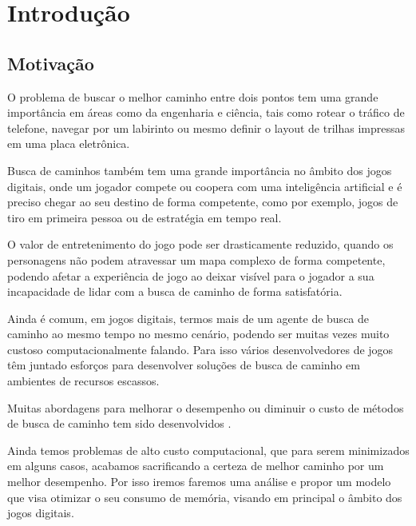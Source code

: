 
\chapter[Introdução]{Introdução}

\section{Motivação}

O problema de buscar o melhor caminho entre dois pontos tem uma grande importância em áreas como da engenharia e ciência, tais como rotear o tráfico de telefone, navegar por um labirinto ou mesmo definir o layout de trilhas impressas em uma placa eletrônica.

Busca de caminhos também tem uma grande importância no âmbito dos jogos digitais, onde um jogador compete ou coopera com uma inteligência artificial e é preciso chegar ao seu destino de forma competente, como por exemplo, jogos de tiro em primeira pessoa ou de estratégia em tempo real.

O valor de entretenimento do jogo pode ser drasticamente reduzido, quando os personagens não podem atravessar um mapa complexo de forma competente, podendo afetar a experiência de jogo ao deixar visível para o jogador a sua incapacidade de lidar com a busca de caminho de forma satisfatória.

Ainda é comum, em jogos digitais, termos mais de um agente de busca de caminho ao mesmo tempo no mesmo cenário, podendo ser muitas vezes muito custoso computacionalmente falando. Para isso vários desenvolvedores de jogos têm juntado esforços para desenvolver soluções de busca de caminho em ambientes de recursos escassos.\cite{Pontevia}


Muitas abordagens para melhorar o desempenho ou diminuir o custo de métodos de busca de caminho tem sido desenvolvidos \cite{Ulysses}  \cite{Pollack} \cite{Timothy} \cite{WilliamMiller}. 

Ainda temos problemas de alto custo computacional, que para serem minimizados em alguns casos, acabamos sacrificando a certeza de melhor caminho por um melhor desempenho\cite{Botea}\cite{KORF199341}\cite{Russell}. Por isso iremos faremos uma análise e propor um modelo que visa otimizar o seu consumo de memória, visando em principal o âmbito dos jogos digitais.

